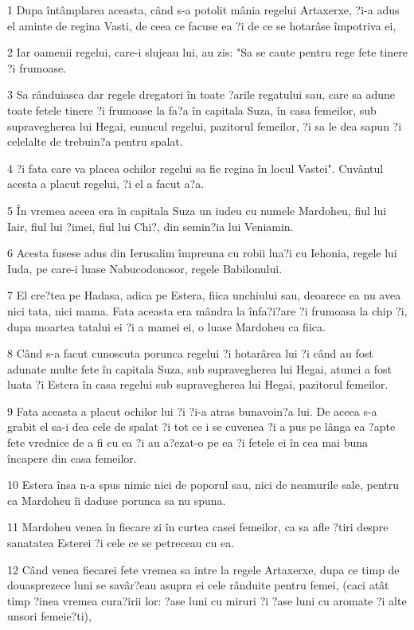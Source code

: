 \par 1 Dupa întâmplarea aceasta, când s-a potolit mânia regelui Artaxerxe, ?i-a adus el aminte de regina Vasti, de ceea ce facuse ea ?i de ce se hotarâse împotriva ei,
\par 2 Iar oamenii regelui, care-i slujeau lui, au zis: "Sa se caute pentru rege fete tinere ?i frumoase.
\par 3 Sa rânduiasca dar regele dregatori în toate ?arile regatului sau, care sa adune toate fetele tinere ?i frumoase la fa?a în capitala Suza, în casa femeilor, sub supravegherea lui Hegai, eunucul regelui, pazitorul femeilor, ?i sa le dea sapun ?i celelalte de trebuin?a pentru spalat.
\par 4 ?i fata care va placea ochilor regelui sa fie regina în locul Vastei". Cuvântul acesta a placut regelui, ?i el a facut a?a.
\par 5 În vremea aceea era în capitala Suza un iudeu cu numele Mardoheu, fiul lui Iair, fiul lui ?imei, fiul lui Chi?, din semin?ia lui Veniamin.
\par 6 Acesta fusese adus din Ierusalim împreuna cu robii lua?i cu Iehonia, regele lui Iuda, pe care-i luase Nabucodonosor, regele Babilonului.
\par 7 El cre?tea pe Hadasa, adica pe Estera, fiica unchiului sau, deoarece ea nu avea nici tata, nici mama. Fata aceasta era mândra la înfa?i?are ?i frumoasa la chip ?i, dupa moartea tatalui ei ?i a mamei ei, o luase Mardoheu ca fiica.
\par 8 Când s-a facut cunoscuta porunca regelui ?i hotarârea lui ?i când au fost adunate multe fete în capitala Suza, sub supravegherea lui Hegai, atunci a fost luata ?i Estera în casa regelui sub supravegherea lui Hegai, pazitorul femeilor.
\par 9 Fata aceasta a placut ochilor lui ?i ?i-a atras bunavoin?a lui. De aceea s-a grabit el sa-i dea cele de spalat ?i tot ce i se cuvenea ?i a pus pe lânga ea ?apte fete vrednice de a fi cu ea ?i au a?ezat-o pe ea ?i fetele ei în cea mai buna încapere din casa femeilor.
\par 10 Estera însa n-a spus nimic nici de poporul sau, nici de neamurile sale, pentru ca Mardoheu îi daduse porunca sa nu spuna.
\par 11 Mardoheu venea în fiecare zi în curtea casei femeilor, ca sa afle ?tiri despre sanatatea Esterei ?i cele ce se petreceau cu ea.
\par 12 Când venea fiecarei fete vremea sa intre la regele Artaxerxe, dupa ce timp de douasprezece luni se savâr?eau asupra ei cele rânduite pentru femei, (caci atât timp ?inea vremea cura?irii lor: ?ase luni cu miruri ?i ?ase luni cu aromate ?i alte unsori femeie?ti),
